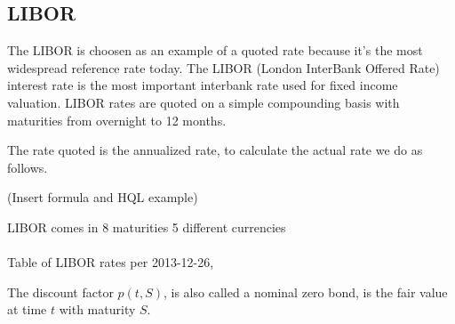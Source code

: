 \documentclass[11pt,a4paper]{article}
\numberwithin{equation}{section}
\begin{document}
	\subsection{LIBOR}
        The LIBOR is choosen as an example of a quoted rate because it's the most widespread reference rate today.
        The LIBOR (London InterBank Offered Rate) interest rate is the most important interbank rate
	used for fixed income valuation. LIBOR rates are quoted on a simple compounding basis with maturities
	from overnight to 12 months.

	The rate quoted is the annualized rate, to calculate the actual rate we do as follows.

        (Insert formula and HQL example)

	\begin{minipage}{\linewidth}
	\label{fig:comp01}
	\end{minipage}


	LIBOR comes in 8 maturities
	5 different currencies
	\\
	\\
	Table of LIBOR rates per 2013-12-26,




        The discount factor $p(t,S)$, is also called a nominal zero bond, is the fair value at time $t$ with maturity $S$.
\end{document}
